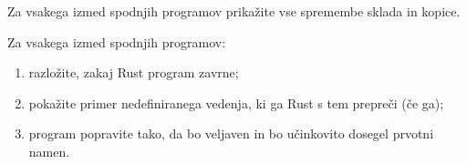 \documentclass[arhiv]{../izpit}
\begin{document}


\naloga[\tocke{15}]

Za vsakega izmed spodnjih programov prikažite vse spremembe sklada in kopice.

\podnaloga

\podnaloga

\podnaloga



\naloga[\tocke{35}]

Za vsakega izmed spodnjih programov:
\begin{enumerate}
  \item razložite, zakaj Rust program zavrne;
  \item pokažite primer nedefiniranega vedenja, ki ga Rust s tem prepreči (če ga);
  \item program popravite tako, da bo veljaven in bo učinkovito dosegel prvotni namen.
\end{enumerate}

\podnaloga

\podnaloga

\podnaloga

\podnaloga

\podnaloga
\end{document}

